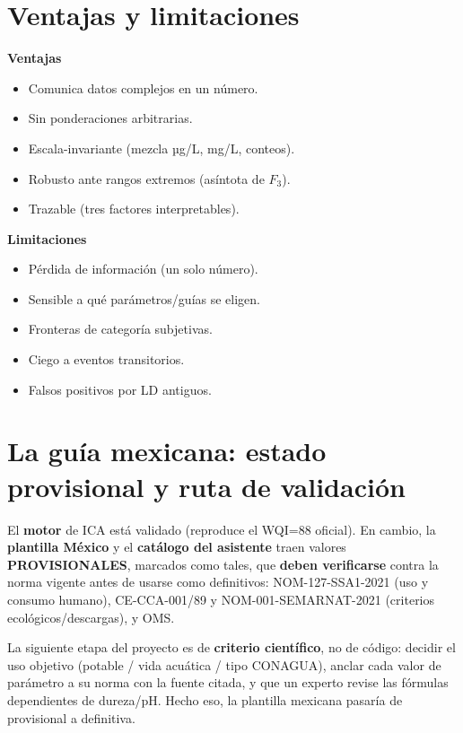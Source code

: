 \documentclass[11pt,a4paper]{article}
\begin{document}
\section{Ventajas y limitaciones}
\begin{minipage}[t]{0.49\textwidth}
\textbf{Ventajas}
\begin{itemize}[leftmargin=1.1em,nosep]
  \item Comunica datos complejos en un número.
  \item Sin ponderaciones arbitrarias.
  \item Escala-invariante (mezcla µg/L, mg/L, conteos).
  \item Robusto ante rangos extremos (asíntota de $F_3$).
  \item Trazable (tres factores interpretables).
\end{itemize}
\end{minipage}\hfill
\begin{minipage}[t]{0.49\textwidth}
\textbf{Limitaciones}
\begin{itemize}[leftmargin=1.1em,nosep]
  \item Pérdida de información (un solo número).
  \item Sensible a qué parámetros/guías se eligen.
  \item Fronteras de categoría subjetivas.
  \item Ciego a eventos transitorios.
  \item Falsos positivos por LD antiguos.
\end{itemize}
\end{minipage}

\section{La guía mexicana: estado provisional y ruta de validación}
\begin{warnbox}
El \textbf{motor} de ICA está validado (reproduce el WQI=88 oficial). En cambio, la \textbf{plantilla
México} y el \textbf{catálogo del asistente} traen valores \textbf{PROVISIONALES}, marcados como tales,
que \textbf{deben verificarse} contra la norma vigente antes de usarse como definitivos:
NOM-127-SSA1-2021 (uso y consumo humano), CE-CCA-001/89 y NOM-001-SEMARNAT-2021 (criterios
ecológicos/descargas), y OMS.
\end{warnbox}
La siguiente etapa del proyecto es de \textbf{criterio científico}, no de código: decidir el uso
objetivo (potable / vida acuática / tipo CONAGUA), anclar cada valor de parámetro a su norma con la
fuente citada, y que un experto revise las fórmulas dependientes de dureza/pH. Hecho eso, la plantilla
mexicana pasaría de provisional a definitiva.
\end{document}
